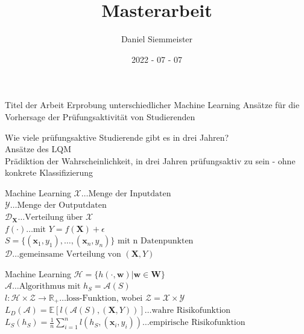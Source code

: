 \documentclass[17pt, fleqn]{beamer}
\title[]{Masterarbeit}
\author[]{Daniel Siemmeister}
\date[]{2022 - 07 - 07}
\begin{document}
\begin{frame}[plain]
    \titlepage    
\end{frame}

\begin{frame}{Titel der Arbeit}
\centering
\large{Erprobung unterschiedlicher Machine Learning Ansätze für die Vorhersage der Prüfungsaktivität von Studierenden}
\end{frame}

\begin{frame}
    Wie viele prüfungsaktive Studierende gibt es in drei Jahren? \\[1cm]
    \pause
    Ansätze des LQM \\[1cm]
    \pause
    Prädiktion der Wahrscheinlichkeit, in drei Jahren prüfungsaktiv zu sein - ohne konkrete Klassifizierung
\end{frame}

\begin{frame}{Machine Learning}
    \small{
    $ \mathcal{X} \dots \text{Menge der Inputdaten} $ \\[0.2cm]
    $ \mathcal{Y} \dots \text{Menge der Outputdaten} $ \\[0.2cm]
    $ \mathcal{D_{\mathbf{X}}} \dots \text{Verteilung über } \mathcal{X} $ \\[0.2cm]
    $ f(\cdot) \dots \text{mit } Y = f(\mathbf{X}) + \epsilon $ \\[0.2cm]
    $ S = \{ (\mathbf{x}_1, y_1), \dots , (\mathbf{x}_n, y_n) \} \text{ mit n Datenpunkten} $ \\[0.2cm]
    $ \mathcal{D} \dots \text{gemeinsame Verteilung von } (\mathbf{X}, Y) $ \\[0.2cm]
    }
\end{frame}

\begin{frame}{Machine Learning}
    \small{
    $ \mathcal{H} = \{ h( \cdot, \mathbf{w}) | \mathbf{w} \in \mathbf{W} \} $ \\[0.2cm]
    $ \mathcal{A} \dots \text{Algorithmus mit } h_S = \mathcal{A}(S) $ \\[0.2cm]
    $ l : \mathcal{H} \times \mathcal{Z} \rightarrow \mathbb{R}_+ \dots \text{loss-Funktion, wobei } \mathcal{Z} = \mathcal{X} \times \mathcal{Y} $ \\[0.2cm]
    $ L_D(\mathcal{A}) = \mathbb{E}[l(\mathcal{A}(S), (\mathbf{X}, Y)) ] \dots \text{wahre Risikofunktion} $ \\[0.2cm]
    $ L_S(h_S) = \frac{1}{n} \sum_{i=1}^n l(h_S, (\mathbf{x}_i, y_i)) \dots \text{empirische Risikofunktion} $ \\[0.2cm]
    }
\end{frame}
\end{document}
